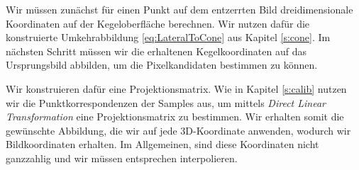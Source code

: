 Wir müssen zunächst für einen Punkt auf dem entzerrten Bild  dreidimensionale Koordinaten auf der Kegeloberfläche berechnen. Wir nutzen dafür die konstruierte Umkehrabbildung \ref{eq:LateralToCone} aus Kapitel \ref{s:cone}. Im nächsten Schritt müssen wir die erhaltenen Kegelkoordinaten auf das Ursprungsbild abbilden, um die Pixelkandidaten bestimmen zu können.

Wir konstruieren dafür eine Projektionsmatrix. Wie in Kapitel \ref{s:calib} nutzen wir die  Punktkorrespondenzen der Samples aus, um mittels \textit{Direct Linear Transformation} eine Projektionsmatrix zu bestimmen.
Wir erhalten somit die gewünschte Abbildung, die wir auf jede 3D-Koordinate anwenden, wodurch wir Bildkoordinaten erhalten. Im Allgemeinen, sind diese Koordinaten nicht ganzzahlig und wir müssen entsprechen interpolieren.


